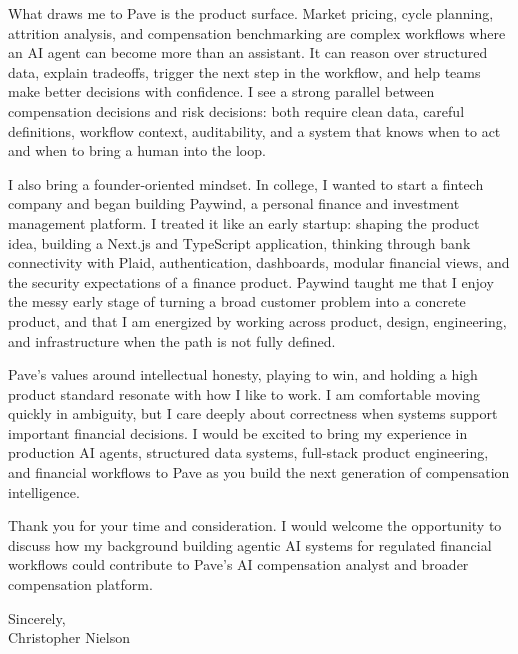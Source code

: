 \documentclass[11pt]{article}
\begin{document}
What draws me to Pave is the product surface. Market pricing, cycle planning, attrition analysis, and compensation benchmarking are complex workflows where an AI agent can become more than an assistant. It can reason over structured data, explain tradeoffs, trigger the next step in the workflow, and help teams make better decisions with confidence. I see a strong parallel between compensation decisions and risk decisions: both require clean data, careful definitions, workflow context, auditability, and a system that knows when to act and when to bring a human into the loop.

I also bring a founder-oriented mindset. In college, I wanted to start a fintech company and began building Paywind, a personal finance and investment management platform. I treated it like an early startup: shaping the product idea, building a Next.js and TypeScript application, thinking through bank connectivity with Plaid, authentication, dashboards, modular financial views, and the security expectations of a finance product. Paywind taught me that I enjoy the messy early stage of turning a broad customer problem into a concrete product, and that I am energized by working across product, design, engineering, and infrastructure when the path is not fully defined.

Pave's values around intellectual honesty, playing to win, and holding a high product standard resonate with how I like to work. I am comfortable moving quickly in ambiguity, but I care deeply about correctness when systems support important financial decisions. I would be excited to bring my experience in production AI agents, structured data systems, full-stack product engineering, and financial workflows to Pave as you build the next generation of compensation intelligence.

Thank you for your time and consideration. I would welcome the opportunity to discuss how my background building agentic AI systems for regulated financial workflows could contribute to Pave's AI compensation analyst and broader compensation platform.

\vspace{0.35em}
Sincerely,\\[0.35em]
Christopher Nielson
\end{document}
